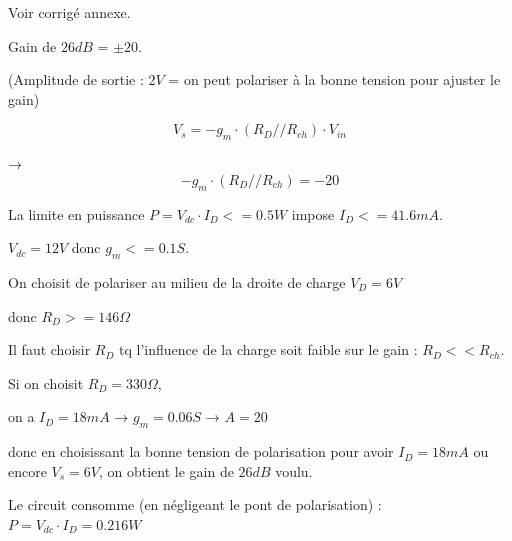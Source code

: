 \documentclass{../template/labo}
\begin{document}
{
Voir corrigé annexe.

Gain de $26dB$ = $\pm 20$.

(Amplitude de sortie : $2V$ = on peut polariser à la bonne tension pour ajuster le gain)



$$V_s=-g_m\cdot \left( R_D//R_{ch} \right) \cdot V_{in}$$

→ $$-g_m\cdot \left( R_D//R_{ch}\right) =-20$$





La limite en puissance $P=V_{dc}\cdot I_D<=0.5W$ impose $I_D<=41.6mA$.

$V_{dc}=12V$ donc $g_m<=0.1S$.

On choisit de polariser au milieu de la droite de charge $V_D=6V$

donc $R_D>=146\Omega$

Il faut choisir $R_D$ tq l'influence de la charge soit faible sur le gain : $R_D<<R_{ch}$.

Si on choisit $R_D=330\Omega$,

on a $I_D=18mA$ → $g_m=0.06S$ → $A= 20$

donc en choisissant la bonne tension de polarisation pour avoir $I_D=18mA$ ou encore $V_s=6V$, on obtient le gain de $26dB$ voulu.

Le circuit consomme (en négligeant le pont de polarisation) : $P=V_{dc}\cdot I_D=0.216W$
}
\end{document}
